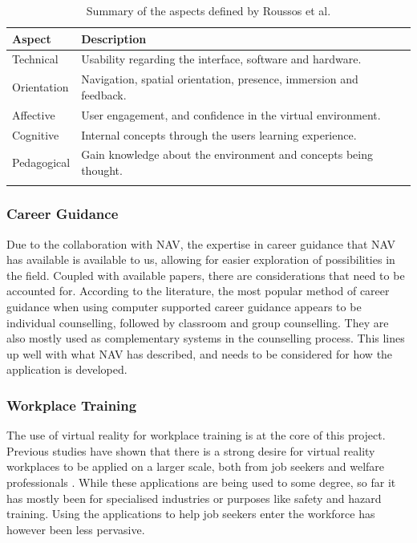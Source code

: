 \begin{table}[!ht]
      \centering
      \caption{Summary of the aspects defined by Roussos et al. \cite{roussos1999learning} }
        \begin{tabularx}{\textwidth}{l X}
        \toprule
        Aspect \hspace{1.5cm} & Description \\
        \midrule
        Technical & Usability regarding the interface, software and hardware.
        \vspace{0.2cm}
        \\
        Orientation & Navigation, spatial orientation, presence, immersion and feedback. 
        \vspace{0.2cm}
        \\
        Affective & User engagement, and confidence in the virtual environment.
        \vspace{0.2cm}
        \\
        Cognitive & Internal concepts through the users learning experience.
        \vspace{0.2cm}
        \\
        Pedagogical & Gain knowledge about the environment and concepts being thought.
        \vspace{0.2cm}
        \\
        \bottomrule
        \label{table:awarenessAspects}
        \end{tabularx}
\end{table}

\subsubsection{Career Guidance}
Due to the collaboration with NAV, the expertise in career guidance that NAV has available is available to us, allowing for easier exploration of possibilities in the field. Coupled with available papers, there are considerations that need to be accounted for. According to the literature, the most popular method of career guidance when using computer supported career guidance appears to be individual counselling, followed by classroom and group counselling. They are also mostly used as complementary systems in the counselling process\cite{sampson1987computer}. This lines up well with what NAV has described, and needs to be considered for how the application is developed. 



\subsubsection{Workplace Training}
The use of virtual reality for workplace training is at the core of this project. Previous studies have shown that there is a strong desire for virtual reality workplaces to be applied on a larger scale, both from job seekers and welfare professionals \cite{prasolova2019empowering}. While these applications are being used to some degree, so far it has mostly been for specialised industries or purposes like safety and hazard training. Using the applications to help job seekers enter the workforce has however been less pervasive. 

